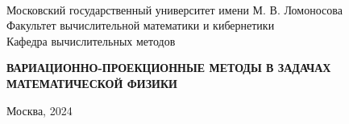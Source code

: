 \documentclass[12pt, a4paper]{article}
\begin{document}
\thispagestyle{empty}

\begin{center}
	\ \vspace{-1cm}

	{Московский государственный университет имени М. В. Ломоносова}\\
	Факультет вычислительной математики и кибернетики\\
	Кафедра вычислительных методов

	\vspace{8cm}
	\begin{spacing}{2.5}
		{\huge \bfseries ВАРИАЦИОННО-ПРОЕКЦИОННЫЕ МЕТОДЫ В ЗАДАЧАХ МАТЕМАТИЧЕСКОЙ ФИЗИКИ}
	\end{spacing}


\end{center}

\vfill

\begin{center}
	Москва, 2024
\end{center}

\enlargethispage{2\baselineskip}

\newpage

\tableofcontents

\newpage















\end{document}
